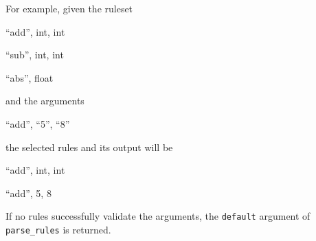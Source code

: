 \documentclass{article}
\begin{document}
			For example, given the ruleset

			\begin{center}
				\item ``add'', int, int
				\item ``sub'', int, int
				\item ``abs'', float
			\end{center}

			and the arguments

			\begin{center}
				\item ``add'', ``5'', ``8''
			\end{center}

			the selected rules and its output will be

			\begin{center}
				\item ``add'', int, int
				\item ``add'', 5, 8
			\end{center}

			If no rules successfully validate the arguments, the \verb|default| argument of
			\verb|parse_rules| is returned.
\end{document}

